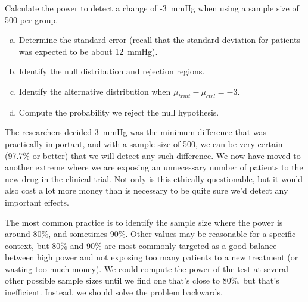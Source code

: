 \begin{exercisewrap}
\begin{nexercise}
Calculate the power to detect a change of -3~mmHg when using a sample size of 500 per group.\footnotemark{}
\begin{enumerate}[(a)]
\setlength{\itemsep}{0mm}
\item Determine the standard error (recall that the standard deviation for patients was expected to be about 12~mmHg).
\item Identify the null distribution and rejection regions.
\item Identify the alternative distribution when $\mu_{trmt} - \mu_{ctrl} = -3$.
\item Compute the probability we reject the null hypothesis.
\end{enumerate}
\end{nexercise}
\end{exercisewrap}

The researchers decided 3~mmHg was the minimum difference that was practically important, and with a sample size of 500, we can be very certain (97.7\% or better) that we will detect any such difference. We now have moved to another extreme where we are exposing an unnecessary number of patients to the new drug in the clinical trial. Not only is this ethically questionable, but it would also cost a lot more money than is necessary to be quite sure we'd detect any important effects.

The most common practice is to identify the sample size where the power is around 80\%, and sometimes 90\%. Other values may be reasonable for a specific context, but 80\% and 90\% are most commonly targeted as a good balance between high power and not exposing too many patients to a new treatment (or wasting too much money). We could compute the power of the test at several other possible sample sizes until we find one that's close to 80\%, but that's inefficient. Instead, we should solve the problem backwards.

